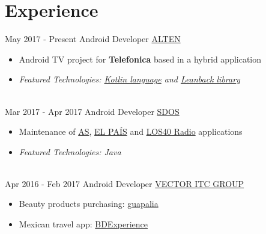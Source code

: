 \documentclass[letterpaper]{twentysecondcv} %
\begin{document}
\makeprofile %


\section{Experience}

\begin{twenty} %
\twentyitem
    	{May 2017 -}
		{Present}
        {Android Developer}
        {\href{http://www.alten.es/}{ALTEN}}
        {}
        {\begin{itemize}
        \item Android TV project for \textbf{Telefonica} based in a hybrid application
        \item \textit{Featured Technologies: \href{https://developer.android.com/kotlin/index.html}{Kotlin language} and \href{https://developer.android.com/tv/index.html}{Leanback library}}
        \end{itemize}}
        \\
	\twentyitem
    	{Mar 2017 -}
		{Apr 2017}
        {Android Developer}
        {\href{http://sdos.es/}{SDOS}}
        {}
        {
        {\begin{itemize}
        \item Maintenance of \href{https://play.google.com/store/apps/details?id=es.mmip.prisacom.as}{AS}, \href{https://play.google.com/store/apps/details?id=com.elpais.elpais}{EL PAÍS} and \href{https://play.google.com/store/apps/details?id=com.prisaradio.replicapp.loscuarenta}{LOS40 Radio} applications
        \item \textit{Featured Technologies: Java} 
    \end{itemize}}
        }
    \\   
    \twentyitem
   		{Apr 2016 -}
		{Feb 2017}
        {Android Developer}
        {\href{http://www.vectoritcgroup.com/es/home/global}{VECTOR ITC GROUP}}
        {}
        {
        {\begin{itemize}
        \item Beauty products purchasing: \href{https://play.google.com/store/apps/details?id=com.guapalia&hl=es}{guapalia}
        \item Mexican travel app: \href{https://play.google.com/store/apps/details?id=com.bdtravel.re_appbdtravelandroid&hl=es}{BDExperience}

\end{itemize}}}
\end{twenty}
\end{document}
